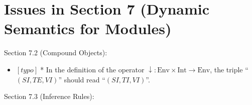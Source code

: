 \documentclass{article}
\newcommand{\m}[1]{$[\mathit{#1}]\;$}
\newcommand{\typo}{\m{typo}}
\begin{document}
\section{Issues in Section 7 (Dynamic Semantics for Modules)}
\label{bugschapter7}

Section 7.2 (Compound Objects):
\nopagebreak

\begin{itemize}
\item \typo * In the definition of the operator $\downarrow:\mbox{Env}\times\mbox{Int}\to\mbox{Env}$, the triple ``$(\mathit{SI},\mathit{TE},\mathit{VI})$'' should read ``$(\mathit{SI},\mathit{TI},\mathit{VI})$''.
\end{itemize}


Section 7.3 (Inference Rules):
\nopagebreak
\end{document}
